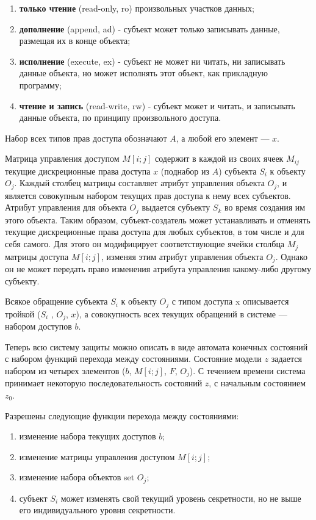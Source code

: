 \begin{enumerate}
	\item\textbf{только чтение} (read-only, ro) произвольных участков данных;
	\item\textbf{дополнение} (append, ad) - субъект может только записывать данные, размещая их в конце объекта;
	\item\textbf{исполнение} (execute, ex) - субъект не может ни читать, ни записывать данные объекта, но может исполнять этот объект, как прикладную программу;
	\item\textbf{чтение и запись} (read-write, rw) - субъект может и читать, и записывать данные объекта, по принципу произвольного доступа.
\end{enumerate}

Набор всех типов прав доступа обозначают $A$, а любой его элемент --- $x$.

Матрица управления доступом $M[i;j]$ содержит в каждой из своих ячеек $M_{ij}$ текущие дискреционные права доступа $x$ (поднабор из $A$) субъекта $S_i$ к объекту $O_j$. Каждый столбец матрицы составляет атрибут управления объекта $O_j$, и является совокупным набором текущих прав доступа к нему всех субъектов. Атрибут управления для объекта $O_j$ выдается субъекту $S_k$ во время создания им этого объекта. Таким образом, субъект-создатель может устанавливать и отменять текущие дискреционные права доступа для любых субъектов, в том числе и для себя самого. Для этого он модифицирует соответствующие ячейки столбца $M_j$ матрицы доступа $M[i;j]$, изменяя этим атрибут управления объекта $O_j$. Однако он не может передать право изменения атрибута управления какому-либо другому субъекту.

Всякое обращение субъекта $S_i$ к объекту $O_j$ с типом доступа x описывается тройкой ($S_i$ , $O_j$, $x$), а совокупность всех текущих обращений в системе --- набором доступов $b$.

Теперь всю систему защиты можно описать в виде автомата конечных состояний с набором функций перехода между состояниями. Состояние модели $z$ задается набором из четырех элементов ($b$, $M[i;j]$, $F$,  $O_j$). С течением времени система принимает некоторую последовательность состояний $z$, с начальным состоянием $z_0$.

Разрешены следующие функции перехода между состояниями:

\begin{enumerate}
	\item изменение набора текущих доступов $b$;
	\item изменение матрицы управления доступом $M[i;j]$;
	\item изменение набора объектов set $O_j$;
	\item субъект $S_i$ может изменять свой текущий уровень секретности, но не выше его индивидуального уровня секретности.
\end{enumerate}

